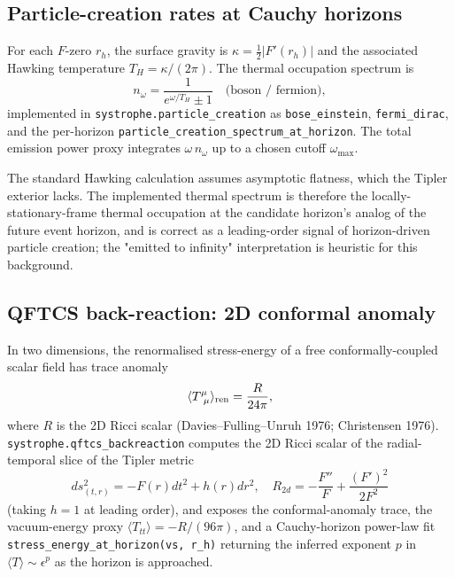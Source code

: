 \documentclass[11pt,a4paper]{article}
\begin{document}
\subsection{Particle-creation rates at Cauchy horizons}

For each $F$-zero $r_h$, the surface gravity is $\kappa = \tfrac{1}{2}
\lvert F'(r_h) \rvert$ and the associated Hawking temperature
$T_H = \kappa / (2\pi)$. The thermal occupation spectrum is
\begin{equation}
n_\omega = \frac{1}{e^{\omega / T_H} \pm 1}
\quad\text{(boson / fermion)},
\end{equation}
implemented in \texttt{systrophe.particle\_creation} as
\texttt{bose\_einstein}, \texttt{fermi\_dirac}, and the per-horizon
\texttt{particle\_creation\_spectrum\_at\_horizon}. The total emission
power proxy integrates $\omega \, n_\omega$ up to a chosen cutoff
$\omega_{\max}$.

The standard Hawking calculation assumes asymptotic flatness, which the
Tipler exterior lacks. The implemented thermal spectrum is therefore
the locally-stationary-frame thermal occupation at the candidate
horizon's analog of the future event horizon, and is correct as a
leading-order signal of horizon-driven particle creation; the
"emitted to infinity" interpretation is heuristic for this background.

\subsection{QFTCS back-reaction: 2D conformal anomaly}

In two dimensions, the renormalised stress-energy of a free
conformally-coupled scalar field has trace anomaly
\begin{equation}
\langle T^\mu_{~\mu} \rangle_{\rm ren} = \frac{R}{24\pi},
\end{equation}
where $R$ is the 2D Ricci scalar (Davies--Fulling--Unruh 1976;
Christensen 1976). \texttt{systrophe.qftcs\_backreaction} computes
the 2D Ricci scalar of the radial-temporal slice of the Tipler metric
\begin{equation}
ds^2_{(t,r)} = -F(r) dt^2 + h(r) dr^2,
\quad
R_{2d} = -\frac{F''}{F} + \frac{(F')^2}{2 F^2}
\end{equation}
(taking $h = 1$ at leading order), and exposes the conformal-anomaly
trace, the vacuum-energy proxy $\langle T_{tt} \rangle = -R/(96\pi)$,
and a Cauchy-horizon power-law fit
\texttt{stress\_energy\_at\_horizon(vs, r\_h)} returning the inferred
exponent $p$ in $\langle T \rangle \sim \epsilon^p$ as the horizon is
approached.
\end{document}
